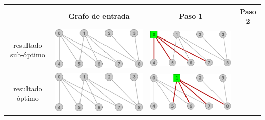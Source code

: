 	\begin{center}
		\begin{tabular}{|c||c||c||c|}
		\hline
		& Grafo de entrada & Paso 1 & Paso 2 \\ 
			\hline
			resultado sub-\'optimo &
			\includegraphics[scale = 0.2]{img/ej3/constructiva_golosa/k5,4Nocompleto_st0.png} &
			\includegraphics[scale = 0.2]{img/ej3/constructiva_golosa/k5,4Nocompleto_st01.png} & \\
			\hline
			resultado \'optimo &
			\includegraphics[scale = 0.2]{img/ej3/constructiva_golosa/k5,4Nocompleto_st0.png} &
			\includegraphics[scale = 0.2]{img/ej3/constructiva_golosa/k5,4Nocompleto_st11.png} & 

\end{tabular}
\end{center}
